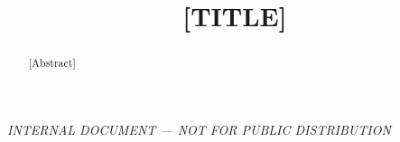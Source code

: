 \documentclass{}
\begin{document}
\widetext%
\centerline{\em INTERNAL DOCUMENT --- NOT FOR PUBLIC DISTRIBUTION\/}

\title{[TITLE]}

\begin{abstract}
    [Abstract]%
\end{abstract}
\keywords{[KEYWORDS]}%
\pacs{}%
\maketitle

\lipsum%
\end{document}
